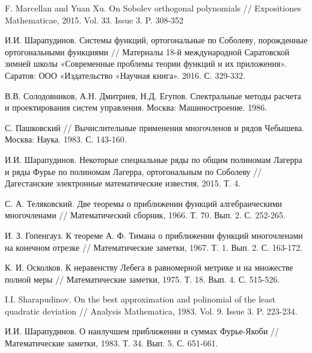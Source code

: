 \begin{thebibliography}{999}
%


F. Marcellan and Yuan Xu. On Sobolev orthogonal polynomials // Expositiones Mathematicae, 2015. Vol. 33. Issue 3. P. 308-352



 И.И. Шарапудинов. Системы функций, ортогональные по Соболеву, порожденные ортогональными функциями // Материалы 18-й международной Саратовской зимней школы «Современные проблемы теории функций и их приложения». Саратов: ООО «Издательство «Научная книга». 2016. С. 329-332.



 В.В. Солодовников, А.Н. Дмитриев, Н.Д. Егупов. Спектральные методы расчета и проектирования систем управления. Москва: Машиностроение. 1986.



 С. Пашковский // Вычислительные применения многочленов и рядов Чебышева. Москва: Наука. 1983. С. 143-160.



 И.И. Шарапудинов. Некоторые специальные ряды по общим полиномам Лагерра и ряды Фурье по полиномам Лагерра, ортогональным по Соболеву // Дагестанские электронные математические известия, 2015. Т. 4.



 С. А. Теляковский. Две теоремы о приближении функций алгебраическими многочленами // Математический сборник, 1966. Т. 70. Вып. 2. С. 252-265.



 И. З. Гопенгауз. К теореме А. Ф. Тимана о приближении функций многочленами на конечном отрезке // Математические  заметки, 1967. Т. 1. Вып. 2. С. 163-172.



 К. И. Осколков. К неравенству Лебега в равномерной метрике и на множестве полной меры // Математические  заметки, 1975. Т. 18. Вып. 4. С. 515-526.



 I.I. Sharapudinov. On the best approximation and polinomial of the least quadratic deviation // Analysis Mathematica, 1983. Vol. 9. Issue 3. P. 223-234.



 И.И. Шарапудинов. О наилучшем приближении и суммах Фурье-Якоби // Математические заметки, 1983. Т. 34. Вып. 5. С. 651-661.



\end{thebibliography}
